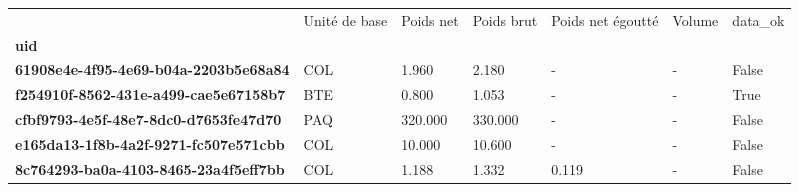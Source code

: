 \begin{tabularx}{\linewidth}{lXXXXXX}
\toprule
{} & Unité de base &  Poids net &  Poids brut &  Poids net égoutté &  Volume &  data\_ok \\
\textbf{uid                                 } &               &            &             &                    &         &          \\
\midrule
\textbf{61908e4e-4f95-4e69-b04a-2203b5e68a84} &           COL &      1.960 &       2.180 &                  - &       - &    False \\
\textbf{f254910f-8562-431e-a499-cae5e67158b7} &           BTE &      0.800 &       1.053 &                  - &       - &     True \\
\textbf{cfbf9793-4e5f-48e7-8dc0-d7653fe47d70} &           PAQ &    320.000 &     330.000 &                  - &       - &    False \\
\textbf{e165da13-1f8b-4a2f-9271-fc507e571cbb} &           COL &     10.000 &      10.600 &                  - &       - &    False \\
\textbf{8c764293-ba0a-4103-8465-23a4f5eff7bb} &           COL &      1.188 &       1.332 &              0.119 &       - &    False \\
\bottomrule
\end{tabularx}
